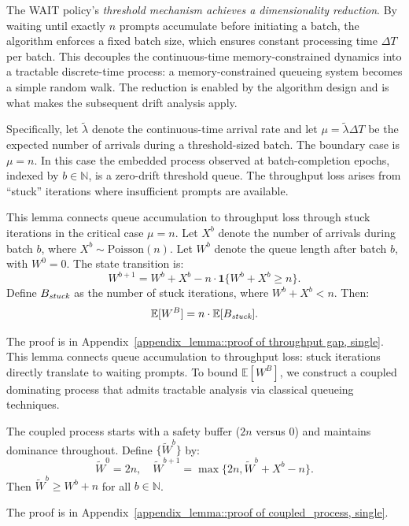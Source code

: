 The WAIT policy's \emph{threshold mechanism achieves a dimensionality reduction}. By waiting until exactly $n$ prompts accumulate before initiating a batch, the algorithm enforces a fixed batch size, which ensures constant processing time $\Delta T$ per batch. This decouples the continuous-time memory-constrained dynamics into a tractable discrete-time process: a memory-constrained queueing system becomes a simple random walk. The reduction is enabled by the algorithm design and is what makes the subsequent drift analysis apply.

Specifically, let \(\tilde{\lambda}\) denote the continuous-time arrival rate and let \(\mu=\tilde{\lambda}\Delta T\) be the expected number of arrivals during a threshold-sized batch. The boundary case is \(\mu=n\). In this case the embedded process observed at batch-completion epochs, indexed by \(b\in\mathbb{N}\), is a zero-drift threshold queue. The throughput loss arises from ``stuck'' iterations where insufficient prompts are available.

\begin{lemma}\label{lemma::throughput gap, single}
This lemma connects queue accumulation to throughput loss through stuck iterations in the critical case \(\mu=n\). Let \(X^b\) denote the number of arrivals during batch \(b\), where \(X^b \sim \mathrm{Poisson}(n)\). Let \(W^b\) denote the queue length after batch \(b\), with \(W^0=0\). The state transition is:
$$W^{b+1}=W^b+X^b-n\cdot \mathbf{1}\{W^b+X^b\geq n\}.$$
Define \(B_{\emph{stuck}}\) as the number of stuck iterations, where \(W^b+X^b<n\). Then:
$$\mathbb{E}[W^B]= n\cdot\mathbb{E}[B_{\emph{stuck}}].$$
\end{lemma}
\noindent The proof is in Appendix~\ref{appendix_lemma::proof of throughput gap, single}. This lemma connects queue accumulation to throughput loss: stuck iterations directly translate to waiting prompts. To bound $\mathbb{E}[W^B]$, we construct a coupled dominating process that admits tractable analysis via classical queueing techniques.

\begin{lemma}\label{lem:coupled_process, single}
The coupled process starts with a safety buffer (\(2n\) versus 0) and maintains dominance throughout. Define \(\{\tilde{W}^b\}\) by:
$$
\tilde{W}^0 = 2n, \quad \tilde{W}^{b+1} = \max\{ 2n, \tilde{W}^b + X^b - n \}.
$$
Then \(\tilde{W}^b \geq W^b + n\) for all \(b\in \mathbb{N}\).
\end{lemma}
\noindent The proof is in Appendix~\ref{appendix_lemma::proof of coupled_process, single}.

